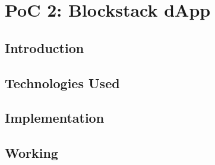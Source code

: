 \chapter{PoC 2: Blockstack dApp}\label{chapter:poc2}

\section{Introduction}

\section{Technologies Used}

\section{Implementation}

\section{Working}